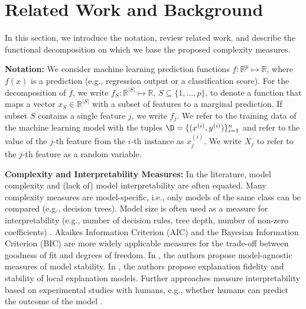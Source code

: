 \documentclass[runningheads]{llncs}\usepackage[]{graphicx}\usepackage[]{color}
\begin{document}
\section{Related Work and Background}
\label{sec:related}

In this section, we introduce the notation, review related work, and describe the functional decomposition on which we base the proposed complexity measures.

\textbf{Notation:} We consider machine learning prediction functions $f:\mathbb{R}^p \mapsto \mathbb{R}$, where $f(x)$ is a prediction (e.g., regression output or a classification score).
For the decomposition of $f$, we write $f_S:\mathbb{R}^{|S|} \mapsto \mathbb{R}$, $S \subseteq\{1, \ldots, p\}$, to denote a function that maps a vector $x_S \in \mathbb{R}^{|S|}$ with a subset of features to a marginal prediction.
If subset $S$ contains a single feature $j$, we write $f_j$.
We refer to the training data of the machine learning model with the tuples $\D = \{(x^{(i)},y^{(i)})\}_{i=1}^n$ and refer to the value of the $j$-th feature from the $i$-th instance as $x_j^{(i)}$.
We write $X_j$ to refer to the $j$-th feature as a random variable.

\textbf{Complexity and Interpretability Measures:}
\label{sec:other}
In the literature, model complexity and (lack of) model interpretability are often equated.
Many complexity measures are model-specific, i.e., only models of the same class can be compared (e.g., decision trees).
Model size is often used as a measure for interpretability (e.g., number of decision rules, tree depth, number of non-zero coefficients) \citep{huysmans2011empirical,ruping2006learning,askira1998knowledge,yang2017scalable,schielzeth2010simple,lakkaraju2017interpretable,furnkranz2012foundations,ustun2016supersparse}.
Akaikes Information Criterion (AIC) %
and the Bayesian Information Criterion (BIC)
are more widely applicable measures for the trade-off between goodness of fit and degrees of freedom.
In \citep{philipp2018measuring}, the authors propose model-agnostic measures of model stability.
In \citep{plumb2019regularizing}, the authors propose explanation fidelity and stability of local explanation models.
Further approaches measure interpretability based on experimental studies with humans, e.g., whether humans can predict the outcome of the model \citep{zhou2018measuring,huysmans2011empirical,dhurandhar2017tip,poursabzi2018manipulating,friedler2019assessing}.
\end{document}
